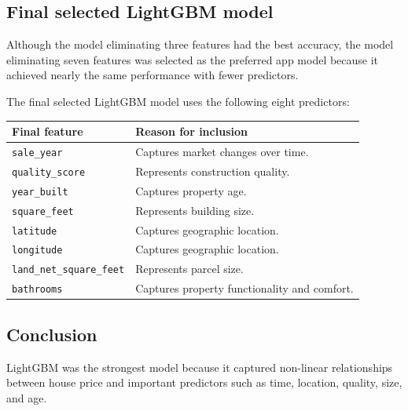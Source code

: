 \documentclass[
  english,
  letterpaper,
  DIV=11,
  numbers=noendperiod]{scrreprt}
\begin{document}
\subsection{Final selected LightGBM
model}\label{final-selected-lightgbm-model}

Although the model eliminating three features had the best accuracy, the
model eliminating seven features was selected as the preferred app model
because it achieved nearly the same performance with fewer predictors.

The final selected LightGBM model uses the following eight predictors:

\begin{longtable}[]{@{}
  >{\raggedright\arraybackslash}p{}
  >{\raggedright\arraybackslash}p{}@{}}
\toprule\noalign{}
\begin{minipage}[b]{\linewidth}\raggedright
Final feature
\end{minipage} & \begin{minipage}[b]{\linewidth}\raggedright
Reason for inclusion
\end{minipage} \\
\midrule\noalign{}
\endhead
\bottomrule\noalign{}
\endlastfoot
\texttt{sale\_year} & Captures market changes over time. \\
\texttt{quality\_score} & Represents construction quality. \\
\texttt{year\_built} & Captures property age. \\
\texttt{square\_feet} & Represents building size. \\
\texttt{latitude} & Captures geographic location. \\
\texttt{longitude} & Captures geographic location. \\
\texttt{land\_net\_square\_feet} & Represents parcel size. \\
\texttt{bathrooms} & Captures property functionality and comfort. \\
\end{longtable}

\subsection{Conclusion}\label{conclusion-2}

LightGBM was the strongest model because it captured non-linear
relationships between house price and important predictors such as time,
location, quality, size, and age.
\end{document}
